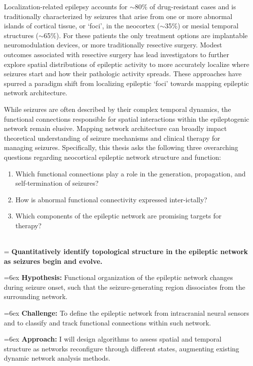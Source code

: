 Localization-related epilepsy accounts for $\sim$80\% of drug-resistant cases and is traditionally characterized by seizures that arise from one or more abnormal islands of cortical tissue, or `foci', in the neocortex ($\sim$35\%) or mesial temporal structures ($\sim$65\%). For these patients the only treatment options are implantable neuromodulation devices, or more traditionally resective surgery. Modest outcomes associated with resective surgery has lead investigators to further explore spatial distributions of epileptic activity to more accurately localize where seizures start and how their pathologic activity spreads. These approaches have spurred a paradigm shift from localizing epileptic ‘foci’ towards mapping epileptic network architecture.

While seizures are often described by their complex temporal dynamics, the functional connections responsible for spatial interactions within the epileptogenic network remain elusive. Mapping network architecture can broadly impact theoretical understanding of seizure mechanisms and clinical therapy for managing seizures. Specifically, this thesis asks the following three overarching questions regarding neocortical epileptic network structure and function:
\begin{enumerate}[topsep=1ex, itemsep=0pt]
    \item Which functional connections play a role in the generation, propagation, and self-termination of seizures?
    \item How is abnormal functional connectivity expressed inter-ictally?
    \item Which components of the epileptic network are promising targets for therapy?
\end{enumerate}

~\\
\hangindent=\parindent
{}
\noindent
{} \textbf{Quantitatively identify topological structure in the epileptic network as seizures begin and evolve.}

\hangindent=6ex
\textbf{Hypothesis:} Functional organization of the epileptic network changes during seizure onset, such that the seizure-generating region dissociates from the surrounding network.

\hangindent=6ex
\textbf{Challenge:} To define the epileptic network from intracranial neural sensors and to classify and track functional connections within such network.

\hangindent=6ex
\textbf{Approach:} I will design algorithms to assess spatial and temporal structure as networks reconfigure through different states, augmenting existing dynamic network analysis methods.

